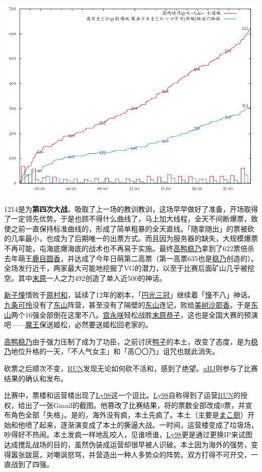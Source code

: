 \includegraphics[width=.5\textwidth]{images/graph1214c.png}

1214是为\textbf{第四次大战}。吸取了上一场的教训教训，这场早早做好了准备，开场取得了一定领先优势。于是也顾不得什么曲线了，马上加大线程，全天不间断爆票，致使之前一直保持标准曲线的，形成了简单粗暴的全天直线。「随拿随出」的票被砍的几率最小，也成为了后期唯一的出票方式。而且因为服务器的缺失，大规模爆票不再可能，屯海底爆海底的战术也不再易于实施。最终\uline{高鸭稳乃}拿到了622票倍杀去年萌王\uline{鹿目圆香}，并达成了今年日萌第二高票（第一高票635也是\uline{稳乃}创造的）。全场发行近千，两家最大可能地挖掘了VG的潜力，以至于比赛后面矿山几乎被挖空。其中\uline{末原}一人之力492创造了单人近500的神话。

\uline{新子憧}惜败于\uline{原村和}，延续了12年的剧本，「\uline{円光三冠}」继续着「\uline{憧}不八」神话。\uline{九条可怜}没有了\uline{东山}阵营，甚至没有了隔壁的\uline{东山}连记，败给\uline{美树沙耶香}。于是\uline{东山}两个16强全部倒在这里不八。\uline{宫永咲}轻松战胜\uline{末原恭子}，这也是全国大赛的预演吧——\uline{魔王}保送{姬松}，必然要送姬松回老家的。

\uline{高鸭稳乃}由于强力压制了成为了功臣，之前讨厌\uline{鸭子}的本土，改变了态度，是为\uline{稳乃}地位升格的一天，「不人气女主」和「高〇〇乃」诅咒也就此消失。

砍票之后顺次不变，\uline{RUN}发现无论如何砍不活和，感到了绝望。\uline{uBJ}则参与了比赛结果的确认和发布。

比赛中，票楼和运营楼出现了\uline{Ly98}这一个逗比。\uline{Ly98}自称得到了运营\uline{RUN}的授权，给出了一张Gmail的截图。他篡改了比赛结果，将的票数全部改成0票，并宣布角色全部「失格」。是的，海外没有疯，本土先疯了。本土（主要是\uline{まこ厨}）开始和他喷了起来，逐渐演变成了本土的撕逼大战。一时间，运营楼变成了垃圾场，吵得好不热闹。本土发疯一样地乱咬人，见谁喷谁，\uline{Ly98}更是通过更换IP来试图达成搅乱战场的目的，虽然伪装成运营却很早被人识破。本土因为海外的强势，变得嚣张跋扈，对嘲讽怒骂，并营造出一种人多势众的阵势。双方打得不可开交，一直战到了四强。

